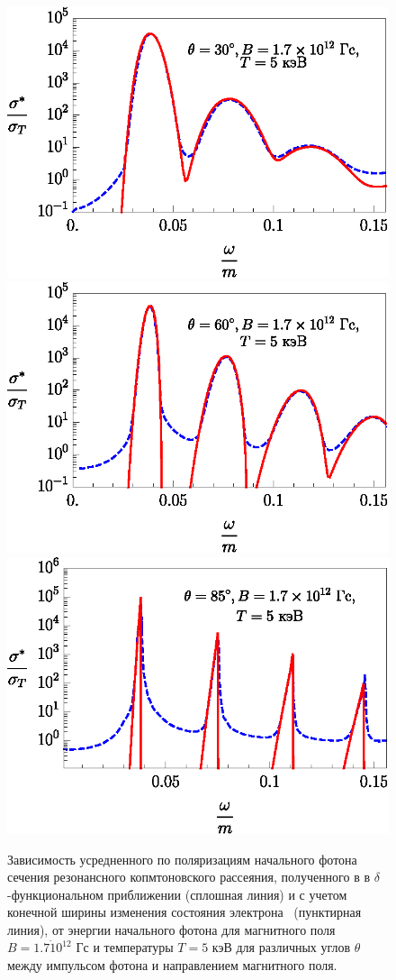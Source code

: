 \documentclass[cp1251%
               ]{jetp} %
\begin{document}
\begin{figure}[t!]\centering
\includegraphics[width=0.9\linewidth,clip]{fig3_1.eps}
\includegraphics[width=0.9\linewidth,clip]{fig3_2.eps}
\includegraphics[width=0.9\linewidth,clip]{fig3_3.eps}
\caption{Зависимость усредненного по поляризациям начального фотона сечения резонансного копмтоновского рассеяния, полученного в в $\delta$-функциональном приближении (сплошная линия) и с учетом конечной ширины изменения состояния электрона~\cite{Harding:1991} (пунктирная линия), от энергии начального фотона для магнитного поля $B = 1.7 \dot 10^{12}$ Гс и температуры $T=5$ кэВ для различных углов $\theta$ между импульсом фотона и направлением магнитного поля.}
\label{fig3}
\end{figure}
\end{document}
